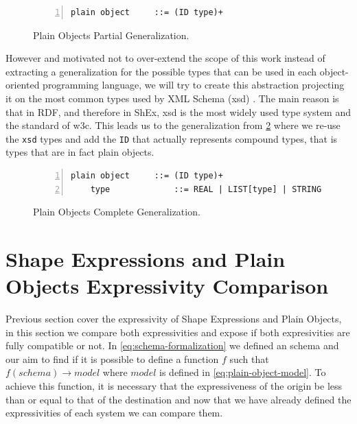 \begin{figure}
    \begin{lstlisting}[numbers=left,basicstyle=\ttfamily\small]
    plain object     ::= (ID type)+
    \end{lstlisting}
    \caption[Plain Objects Partial Generalization]{Plain Objects Partial Generalization.}
    \label{fig:po-generalization}
\end{figure}

However and motivated not to over-extend the scope of this work instead of extracting a generalization for the possible types
that can be used in each object-oriented programming language, we will try to create this abstraction projecting it on the
most common types used by XML Schema (xsd) \cite{xmlschemasimpleelements}. The main reason is that in RDF, and therefore in ShEx, xsd is the most widely
used type system and the standard of w3c. This leads us to the generalization from \cref{fig:po-generalization-complete} where we re-use the
\texttt{xsd} types and add the \texttt{ID} that actually represents compound types, that is types that are in fact plain objects.

\begin{figure}
    \begin{lstlisting}[numbers=left,basicstyle=\ttfamily\small]
    plain object     ::= (ID type)+
    type             ::= REAL | LIST[type] | STRING | BOOLEAN | ID
    \end{lstlisting}
    \caption[Plain Objects Complete Generalization]{Plain Objects Complete Generalization.}
    \label{fig:po-generalization-complete}
\end{figure}


\section{Shape Expressions and Plain Objects Expressivity Comparison}

Previous section cover the expressivity of Shape Expressions and Plain Objects, in this section we compare both expressivities and
expose if both expresivities are fully compatible or not. In \cref{eq:schema-formalization} we defined an schema and our aim to find if it is possible
to define a function $f$ such that $f(schema)\rightarrow model$ where $model$ is defined in \cref{eq:plain-object-model}. To achieve this function, it
is necessary that the expressiveness of the origin be less than or equal to that of the destination and now that we have already defined the
expressivities of each system we can compare them.

